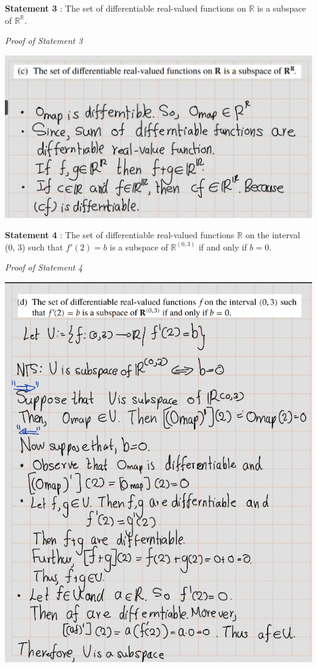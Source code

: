 \documentclass[
]{book}
\theoremstyle{definition}
\theoremstyle{definition}
\theoremstyle{definition}
\theoremstyle{definition}
\theoremstyle{remark}
\begin{document}
\textbf{Statement 3} : The set of differentiable real-valued functions on \(\mathbb{R}\) is a subspace of \(\mathbb{R}^{\mathbb{R}}\).

\emph{Proof of Statement 3}

\includegraphics{fig/Ex1C/Ex2-c.png}

\textbf{Statement 4} : The set of differentiable real-valued functions \(\mathbb{R}\) on the interval (0, 3) such that \(f'(2)=b\) is a subspace of \(\mathbb{R}^{(0,3)}\) if and only if \(b = 0\).

\emph{Proof of Statement 4}

\includegraphics{fig/Ex1C/Ex2-d.png}
\end{document}
